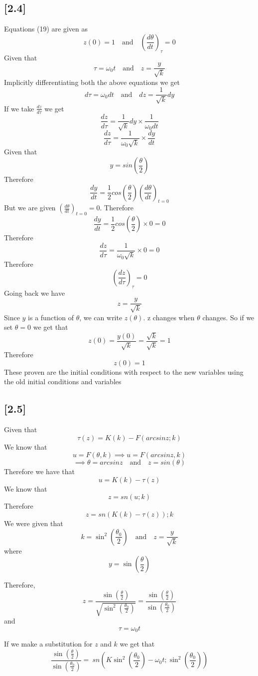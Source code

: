 \documentclass{WitsHomework}
\begin{document}
\subsection*{[2.4]}
Equations (19) are given as
$$z(0)=1 \quad\text{and}\quad \left(\frac{d\theta}{dt}\right)_\tau=0$$
Given that 
$$\tau=\omega_0 t \quad\text{and}\quad z=\frac{y}{\sqrt{k}}$$
Implicitly differentiating both the above equations we get
$$d\tau=\omega_0 dt \quad\text{and}\quad dz=\frac{1}{\sqrt{k}}dy$$
If we take $\frac{dz}{d\tau}$ we get
$$\frac{dz}{d\tau}=\frac{1}{\sqrt{k}}dy\times\frac{1}{\omega_0dt}$$
$$\frac{dz}{d\tau}=\frac{1}{\omega_0\sqrt{k}}\times\frac{dy}{dt}$$
Given that 
$$y=sin\left(\frac{\theta}{2}\right)$$
Therefore
$$\frac{dy}{dt}=\frac{1}{2}cos\left(\frac{\theta}{2}\right)\left(\frac{d\theta}{dt}\right)_{t=0}$$
But we are given $\left(\frac{d\theta}{dt}\right)_{t=0}=0$. Therefore
$$\frac{dy}{dt}=\frac{1}{2}cos\left(\frac{\theta}{2}\right)\times0=0$$
Therefore
$$\frac{dz}{d\tau}=\frac{1}{\omega_0\sqrt{k}}\times0=0$$
Therefore
$$\left(\frac{dz}{d\tau}\right)_\tau=0$$
Going back we have
$$z=\frac{y}{\sqrt{k}}$$
Since $y$ is a function of $\theta$, we can write $z(\theta)$. z changes when $\theta$ changes. So if we set $\theta=0$ we get that
$$z(0)=\frac{y(0)}{\sqrt{k}}=\frac{\sqrt{k}}{\sqrt{k}}=1$$
Therefore
$$z(0)=1$$
These proven are the initial conditions with respect to the new variables using the old initial conditions and variables
\subsection*{[2.5]}
Given that 
$$\tau(z)=K(k)-F(arcsin z;k)$$
We know that 
$$u=F(\theta,k)\implies u=F(arcsinz,k)$$
$$\implies \theta=arcsinz \quad\text{and}\quad z=sin(\theta)$$
Therefore we have that
$$u=K(k)-\tau(z)$$
We know that 
$$z=sn(u;k)$$
Therefore
$$z=sn(K(k)-\tau(z));k$$
We were given that 
\[
k = \sin^2\left(\frac{\theta_0}{2}\right)
\quad \text{and} \quad
z = \frac{y}{\sqrt{k}}
\]
where
\[
y = \sin\left(\frac{\theta}{2}\right)
\]

\noindent Therefore,
\[
z = \frac{\sin\left(\frac{\theta}{2}\right)}{\sqrt{\sin^2\left(\frac{\theta_0}{2}\right)}}
= \frac{\sin\left(\frac{\theta}{2}\right)}{\sin\left(\frac{\theta_0}{2}\right)}
\]
and
\[
\tau = \omega_0 t
\]

\noindent If we make a substitution for \( z \) and \( k \) we get that
\[
\frac{\sin\left(\frac{\theta}{2}\right)}{\sin\left(\frac{\theta_0}{2}\right)} 
= \ sn \left( K \sin^2\left(\frac{\theta_0}{2}\right) - \omega_0 t;\sin^2\left(\frac{\theta_0}{2}\right) \right)
\]
\end{document}
